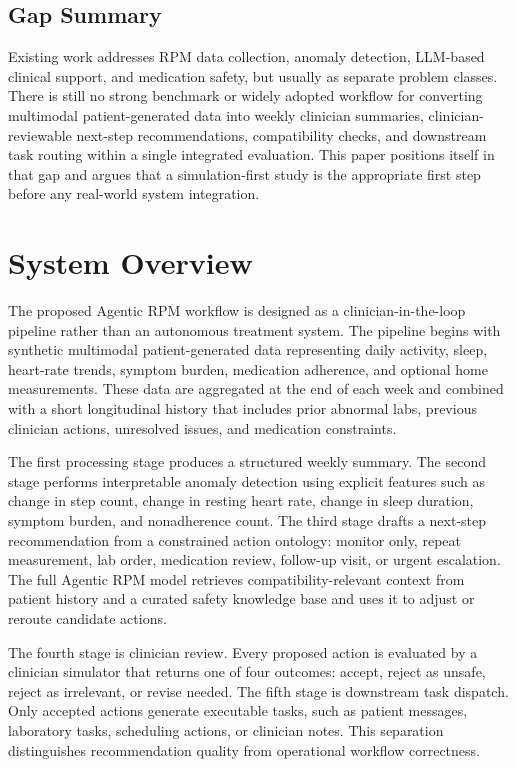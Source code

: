 \documentclass[conference]{IEEEtran}
\begin{document}
\subsection{Gap Summary}

Existing work addresses RPM data collection, anomaly detection, LLM-based clinical support, and medication safety, but usually as separate problem classes. There is still no strong benchmark or widely adopted workflow for converting multimodal patient-generated data into weekly clinician summaries, clinician-reviewable next-step recommendations, compatibility checks, and downstream task routing within a single integrated evaluation. This paper positions itself in that gap and argues that a simulation-first study is the appropriate first step before any real-world system integration.

\section{System Overview}

The proposed Agentic RPM workflow is designed as a clinician-in-the-loop pipeline rather than an autonomous treatment system. The pipeline begins with synthetic multimodal patient-generated data representing daily activity, sleep, heart-rate trends, symptom burden, medication adherence, and optional home measurements. These data are aggregated at the end of each week and combined with a short longitudinal history that includes prior abnormal labs, previous clinician actions, unresolved issues, and medication constraints.

The first processing stage produces a structured weekly summary. The second stage performs interpretable anomaly detection using explicit features such as change in step count, change in resting heart rate, change in sleep duration, symptom burden, and nonadherence count. The third stage drafts a next-step recommendation from a constrained action ontology: monitor only, repeat measurement, lab order, medication review, follow-up visit, or urgent escalation. The full Agentic RPM model retrieves compatibility-relevant context from patient history and a curated safety knowledge base and uses it to adjust or reroute candidate actions.

The fourth stage is clinician review. Every proposed action is evaluated by a clinician simulator that returns one of four outcomes: accept, reject as unsafe, reject as irrelevant, or revise needed. The fifth stage is downstream task dispatch. Only accepted actions generate executable tasks, such as patient messages, laboratory tasks, scheduling actions, or clinician notes. This separation distinguishes recommendation quality from operational workflow correctness.
\end{document}
